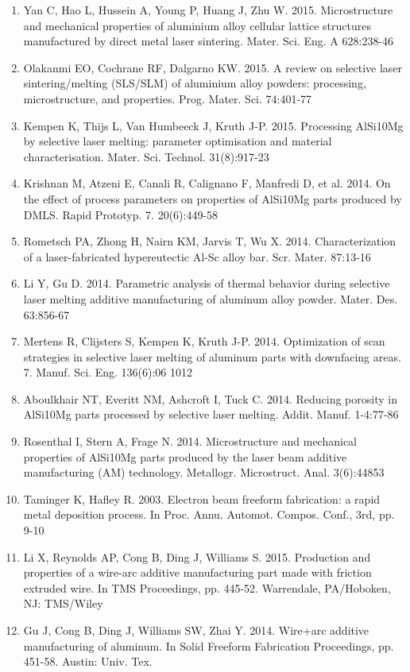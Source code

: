 \documentclass[10pt]{article}
\begin{document}
\begin{enumerate}
  \item Yan C, Hao L, Hussein A, Young P, Huang J, Zhu W. 2015. Microstructure and mechanical properties of aluminium alloy cellular lattice structures manufactured by direct metal laser sintering. Mater. Sci. Eng. A 628:238-46

  \item Olakanmi EO, Cochrane RF, Dalgarno KW. 2015. A review on selective laser sintering/melting (SLS/SLM) of aluminium alloy powders: processing, microstructure, and properties. Prog. Mater. Sci. 74:401-77

  \item Kempen K, Thijs L, Van Humbeeck J, Kruth J-P. 2015. Processing AlSi10Mg by selective laser melting: parameter optimisation and material characterisation. Mater. Sci. Technol. 31(8):917-23

  \item Krishnan M, Atzeni E, Canali R, Calignano F, Manfredi D, et al. 2014. On the effect of process parameters on properties of AlSi10Mg parts produced by DMLS. Rapid Prototyp. 7. 20(6):449-58

  \item Rometsch PA, Zhong H, Nairn KM, Jarvis T, Wu X. 2014. Characterization of a laser-fabricated hypereutectic Al-Sc alloy bar. Scr. Mater. 87:13-16

  \item Li Y, Gu D. 2014. Parametric analysis of thermal behavior during selective laser melting additive manufacturing of aluminum alloy powder. Mater. Des. 63:856-67

  \item Mertens R, Clijsters S, Kempen K, Kruth J-P. 2014. Optimization of scan strategies in selective laser melting of aluminum parts with downfacing areas. 7. Manuf. Sci. Eng. 136(6):06 1012

  \item Aboulkhair NT, Everitt NM, Ashcroft I, Tuck C. 2014. Reducing porosity in AlSi10Mg parts processed by selective laser melting. Addit. Manuf. 1-4:77-86

  \item Rosenthal I, Stern A, Frage N. 2014. Microstructure and mechanical properties of AlSi10Mg parts produced by the laser beam additive manufacturing (AM) technology. Metallogr. Microstruct. Anal. 3(6):44853

  \item Taminger K, Hafley R. 2003. Electron beam freeform fabrication: a rapid metal deposition process. In Proc. Annu. Automot. Compos. Conf., 3rd, pp. 9-10

  \item Li X, Reynolds AP, Cong B, Ding J, Williams S. 2015. Production and properties of a wire-arc additive manufacturing part made with friction extruded wire. In TMS Proceedings, pp. 445-52. Warrendale, PA/Hoboken, NJ: TMS/Wiley

  \item Gu J, Cong B, Ding J, Williams SW, Zhai Y. 2014. Wire+arc additive manufacturing of aluminum. In Solid Freeform Fabrication Proceedings, pp. 451-58. Austin: Univ. Tex.

\end{enumerate}
\end{document}
